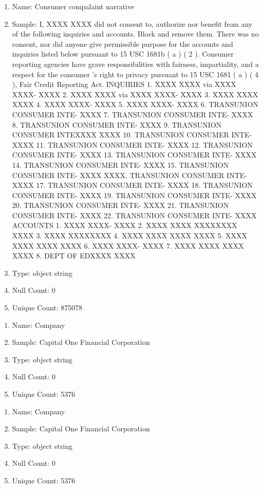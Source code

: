 \documentclass{article}
\begin{document}
\begin{enumerate}
\item Name: Consumer compalaint narrative
\item Sample: 
I, XXXX XXXX did not consent to, authorize nor benefit from any of the following inquiries and accounts. Block and remove them. There was no consent, nor did anyone give permissible purpose for the accounts and inquiries listed below pursuant to 15 USC 1681b ( a ) ( 2 ). Consumer reporting agencies have grave responsibilities with fairness, impartiality, and a respect for the consumer 's right to privacy pursuant to 15 USC 1681 ( a ) ( 4 ), Fair Credit Reporting Act. INQUIRIES 1. XXXX XXXX via XXXX XXXX- XXXX 2. XXXX XXXX via XXXX XXXX- XXXX 3. XXXX XXXX  XXXX 4. XXXX XXXX- XXXX 5. XXXX XXXX- XXXX 6. TRANSUNION CONSUMER INTE- XXXX 7. TRANSUNION CONSUMER INTE-  XXXX 8. TRANSUNION CONSUMER INTE- XXXX 9. TRANSUNION CONSUMER INTEXXXX XXXX 10. TRANSUNION CONSUMER INTE-  XXXX 11. TRANSUNION CONSUMER INTE-  XXXX 12. TRANSUNION CONSUMER INTE-  XXXX 13. TRANSUNION CONSUMER INTE- XXXX 14. TRANSUNION CONSUMER INTE- XXXX 15. TRANSUNION CONSUMER INTE- XXXX XXXX. TRANSUNION CONSUMER INTE- XXXX 17. TRANSUNION CONSUMER INTE- XXXX 18. TRANSUNION CONSUMER INTE- XXXX 19. TRANSUNION CONSUMER INTE- XXXX 20. TRANSUNION CONSUMER INTE- XXXX 21. TRANSUNION CONSUMER INTE- XXXX 22. TRANSUNION CONSUMER INTE- XXXX ACCOUNTS 1. XXXX XXXX- XXXX 2. XXXX XXXX XXXXXXXX XXXX 3. XXXX XXXXXXXX 4. XXXX XXXX XXXX XXXX 5. XXXX XXXX XXXX XXXX 6. XXXX XXXX- XXXX 7. XXXX XXXX XXXX XXXX 8. DEPT OF EDXXXX XXXX
\item Type: object string
\item Null Count: 0
\item Unique Count: 875078
\end{enumerate}

\begin{enumerate}
\item Name: Company
\item Sample: 
Capital One Financial Corporation
\item Type: object string
\item Null Count: 0
\item Unique Count: 5376
\end{enumerate}

\begin{enumerate}
\item Name: Company
\item Sample: 
Capital One Financial Corporation
\item Type: object string
\item Null Count: 0
\item Unique Count: 5376
\end{enumerate}
\end{document}
